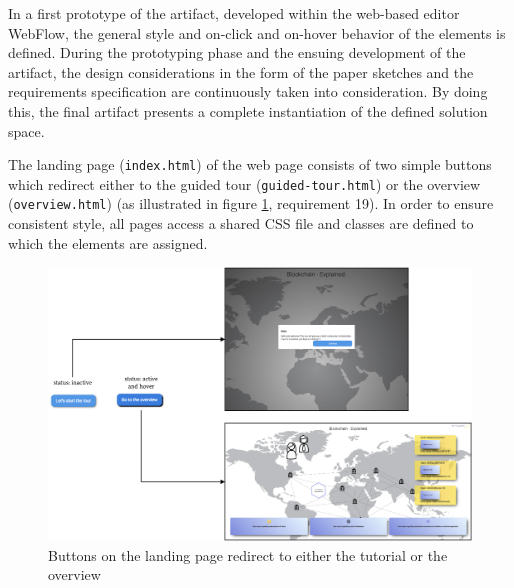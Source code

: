 
In a first prototype of the artifact, developed within the web-based editor WebFlow, the general style and on-click and on-hover behavior of the elements is defined. During the prototyping phase and the ensuing development of the artifact, the design considerations in the form of the paper sketches and the requirements specification are continuously taken into consideration. By doing this, the final artifact presents a complete instantiation of the defined solution space.

The landing page (\texttt{index.html}) of the web page consists of two simple buttons which redirect either to the guided tour (\texttt{guided-tour.html}) or the overview (\texttt{overview.html}) (as illustrated in figure \ref{fig:ButtonStyle}, requirement 19). In order to ensure consistent style, all pages access a shared \ac{CSS} file and classes are defined to which the elements are assigned. 

\begin{figure}
    \centering
    \includegraphics[width=\textwidth]{latex-vorlage_v1.5/graphics/protoAll.png}
    \caption{Buttons on the landing page redirect to either the tutorial or the overview}
    \label{fig:ButtonStyle}
\end{figure}


